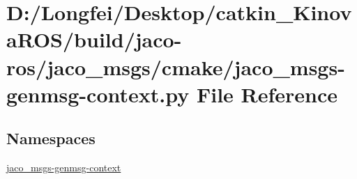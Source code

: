 \hypertarget{jaco__msgs-genmsg-context_8py}{}\section{D\+:/\+Longfei/\+Desktop/catkin\+\_\+\+Kinova\+R\+O\+S/build/jaco-\/ros/jaco\+\_\+msgs/cmake/jaco\+\_\+msgs-\/genmsg-\/context.py File Reference}
\label{jaco__msgs-genmsg-context_8py}
\subsection*{Namespaces}
\begin{DoxyCompactItemize}
\item 
 \hyperlink{namespacejaco__msgs-genmsg-context}{jaco\+\_\+msgs-\/genmsg-\/context}
\end{DoxyCompactItemize}

